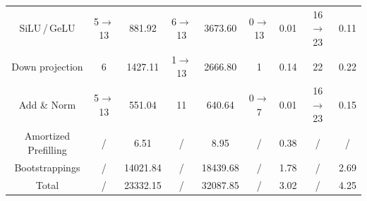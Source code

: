 \begin{table}[t]
\begin{threeparttable}
\begin{tabular}{c|cccccccc}
    SiLU\,/\,GeLU & 5$\rightarrow$13 & 881.92 & 6$\rightarrow$13 & 3673.60 & 0$\rightarrow$13 & 0.01 & 16$\rightarrow$23 & 0.11 \\
    Down projection & 6 & 1427.11 & 1$\rightarrow$13 & 2666.80 & 1 & 0.14 & 22 & 0.22 \\
    Add \& Norm & 5$\rightarrow$13 & 551.04 & 11 & 640.64 & 0$\rightarrow$7 & 0.01 & 16$\rightarrow$23 & 0.15 \\
    Amortized Prefilling & / & 6.51 & / & 8.95 & / & 0.38 & / & / \\
    Bootstrappings & / & 14021.84 & / & 18439.68 & / & 1.78 & / & 2.69 \\
    \midrule
    Total & / & 23332.15 & / & 32087.85 & / & 3.02 & / & 4.25 \\
    \bottomrule
    \end{tabular}%
\end{threeparttable}
\end{table}
